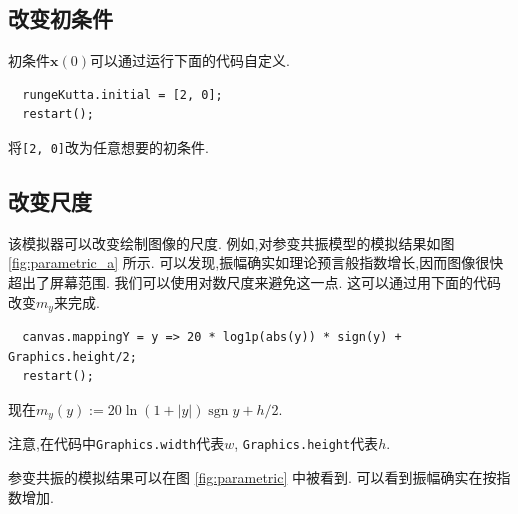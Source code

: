 \documentclass[12pt]{article}
\begin{document}
\subsection{改变初条件}

初条件$\mathbf x\left(0\right)$可以通过运行下面的代码自定义.

\begin{verbatim}
  rungeKutta.initial = [2, 0];
  restart();
\end{verbatim}

将\texttt{[2, 0]}改为任意想要的初条件.

\subsection{改变尺度}

该模拟器可以改变绘制图像的尺度.
例如,对参变共振模型的模拟结果如图 \ref{fig:parametric_a} 所示.
可以发现,振幅确实如理论预言般指数增长,因而图像很快超出了屏幕范围.
我们可以使用对数尺度来避免这一点.
这可以通过用下面的代码改变$m_y$来完成.

\begin{verbatim}
  canvas.mappingY = y => 20 * log1p(abs(y)) * sign(y) + Graphics.height/2;
  restart();
\end{verbatim}

现在$m_y\left(y\right):=20\ln\left(1+\left|y\right|\right)\operatorname{sgn}y+h/2$.

注意,在代码中\texttt{Graphics.width}代表$w$,
\texttt{Graphics.height}代表$h$.

参变共振的模拟结果可以在图 \ref{fig:parametric} 中被看到.
可以看到振幅确实在按指数增加.
\end{document}
